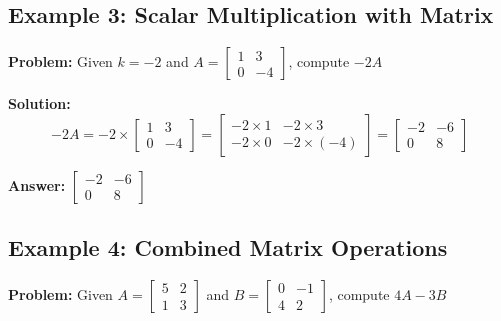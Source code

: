 \documentclass[11pt,a4paper]{article}
\begin{document}
\subsection{Example 3: Scalar Multiplication with Matrix}

\textbf{Problem:} Given $k = -2$ and $A = \begin{bmatrix} 1 & 3 \\ 0 & -4 \end{bmatrix}$, compute $-2A$

\textbf{Solution:}
\begin{equation}
    -2A = -2 \times \begin{bmatrix} 1 & 3 \\ 0 & -4 \end{bmatrix} = \begin{bmatrix} -2 \times 1 & -2 \times 3 \\ -2 \times 0 & -2 \times (-4) \end{bmatrix} = \begin{bmatrix} -2 & -6 \\ 0 & 8 \end{bmatrix}
\end{equation}

\textbf{Answer:} $\begin{bmatrix} -2 & -6 \\ 0 & 8 \end{bmatrix}$

\subsection{Example 4: Combined Matrix Operations}

\textbf{Problem:} Given $A = \begin{bmatrix} 5 & 2 \\ 1 & 3 \end{bmatrix}$ and $B = \begin{bmatrix} 0 & -1 \\ 4 & 2 \end{bmatrix}$, compute $4A - 3B$
\end{document}
